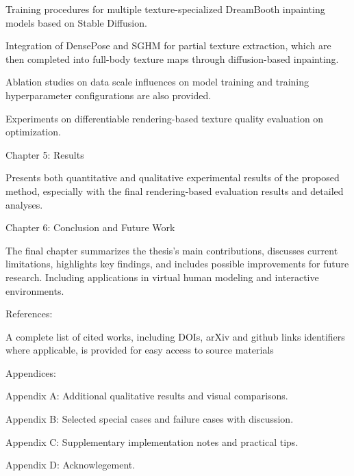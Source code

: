 Training procedures for multiple texture-specialized DreamBooth inpainting models based on Stable Diffusion.

Integration of DensePose and SGHM for partial texture extraction, which are then completed into full-body texture maps through diffusion-based inpainting.

Ablation studies on data scale influences on model training and training hyperparameter configurations are also provided.

Experiments on differentiable rendering-based texture quality evaluation on optimization.

Chapter 5: Results

Presents both quantitative and qualitative experimental results of the proposed method, especially with the final rendering-based evaluation results and detailed analyses.

Chapter 6: Conclusion and Future Work

The final chapter summarizes the thesis's main contributions, discusses current limitations, highlights key findings, and includes possible improvements for future research. Including applications in virtual human modeling and interactive environments.

References:

A complete list of cited works, including DOIs, arXiv and github links identifiers where applicable, is provided for easy access to source materials

Appendices: 

Appendix A: Additional qualitative results and visual comparisons.

Appendix B: Selected special cases and failure cases with discussion.

Appendix C: Supplementary implementation notes and practical tips.

Appendix D: Acknowlegement.